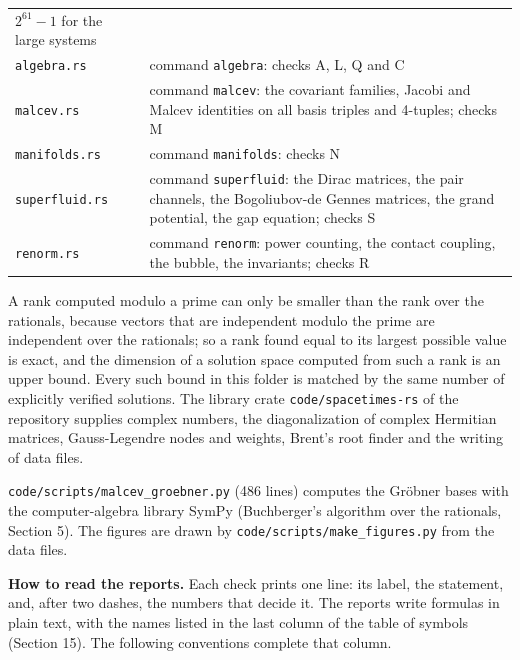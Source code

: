 \documentclass[
  10pt,
]{article}
\begin{document}
\begin{longtable}[]{@{}
  >{\raggedright\arraybackslash}p{}
  >{\raggedright\arraybackslash}p{}@{}}
\(2^{61}-1\) for the large systems \\*
\texttt{algebra.rs} & command \texttt{algebra}: checks A, L, Q and C \\*
\texttt{malcev.rs} & command \texttt{malcev}: the covariant families,
Jacobi and Malcev identities on all basis triples and 4-tuples; checks
M \\*
\texttt{manifolds.rs} & command \texttt{manifolds}: checks N \\*
\texttt{superfluid.rs} & command \texttt{superfluid}: the Dirac
matrices, the pair channels, the Bogoliubov-de Gennes matrices, the
grand potential, the gap equation; checks S \\*
\texttt{renorm.rs} & command \texttt{renorm}: power counting, the
contact coupling, the bubble, the invariants; checks R \\
\end{longtable}

A rank computed modulo a prime can only be smaller than the rank over
the rationals, because vectors that are independent modulo the prime are
independent over the rationals; so a rank found equal to its largest
possible value is exact, and the dimension of a solution space computed
from such a rank is an upper bound. Every such bound in this folder is
matched by the same number of explicitly verified solutions. The library
crate \texttt{code/spacetimes-rs} of the repository supplies complex
numbers, the diagonalization of complex Hermitian matrices,
Gauss-Legendre nodes and weights, Brent's root finder and the writing of
data files.

\texttt{code/scripts/malcev\_groebner.py} (486 lines) computes the
Gröbner bases with the computer-algebra library SymPy (Buchberger's
algorithm over the rationals, Section 5). The figures are drawn by
\texttt{code/scripts/make\_figures.py} from the data files.

\textbf{How to read the reports.} Each check prints one line: its label,
the statement, and, after two dashes, the numbers that decide it. The
reports write formulas in plain text, with the names listed in the last
column of the table of symbols (Section 15). The following conventions
complete that column.
\end{document}
